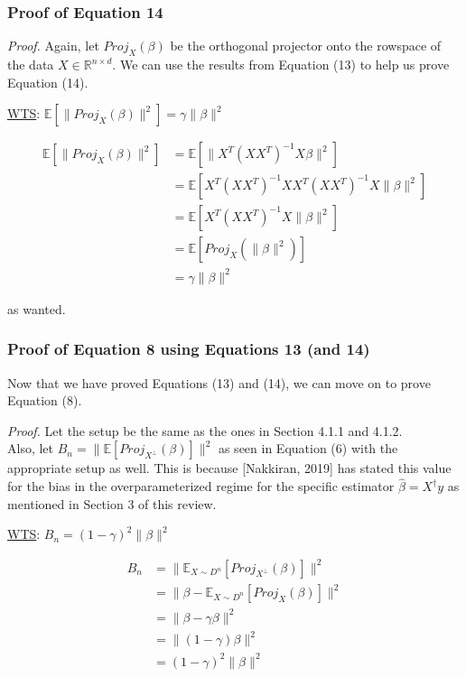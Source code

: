 \documentclass{article}
\begin{document}
\subsubsection{Proof of Equation 14}

\emph{Proof.}
Again, let $Proj_X (\beta)$ be the orthogonal projector onto the rowspace of the data $X\in \mathbb{R}^{n \times d}$. We can use the results from Equation (13) to help us prove Equation (14).

\underline{WTS}: $\mathbb{E} [\|Proj_X (\beta)\|^2] = \gamma \|\beta\|^2$ 

\begin{align*}
    \mathbb{E} [\|Proj_X (\beta)\|^2] &= \mathbb{E} [\|X^{T}(XX^{T})^{-1}X\beta\|^2]\\
    &= \mathbb{E} [X^{T}(XX^{T})^{-1}XX^{T}(XX^{T})^{-1}X\|\beta\|^2]\\
    &= \mathbb{E} [X^{T}(XX^{T})^{-1}X\|\beta\|^2]\\
    &= \mathbb{E} [Proj_X (\|\beta\|^2)]\\
    &= \gamma \|\beta\|^2
\end{align*}

as wanted.



\subsubsection{Proof of Equation 8 using Equations 13 (and 14)}

Now that we have proved Equations (13) and (14), we can move on to prove Equation (8). 

\emph{Proof.}
Let the setup be the same as the ones in Section 4.1.1 and 4.1.2. \\
Also, let $B_n = \|\mathbb{E} [Proj_{X^\perp} (\beta)]\|^2$ as seen in Equation (6) with the appropriate setup as well. This is because [Nakkiran, 2019] has stated this value for the bias in the overparameterized regime for the specific estimator $\hat{\beta} = X^{\dagger}y$ as mentioned in Section 3 of this review.

\underline{WTS}: $B_n = (1-\gamma)^2 \|\beta\|^2$

\begin{align*}
    B_n &= \|\mathbb{E}_{X \sim D^n}[Proj_{X^\perp} (\beta)]\|^2\\
    &= \|\beta - \mathbb{E}_{X \sim D^n} [Proj_X (\beta)]\|^2\\
    &= \|\beta - \gamma \beta\|^2\\
    &= \|(1-\gamma)\beta\|^2\\
    &= (1-\gamma)^2 \|\beta\|^2
\end{align*}
\end{document}
